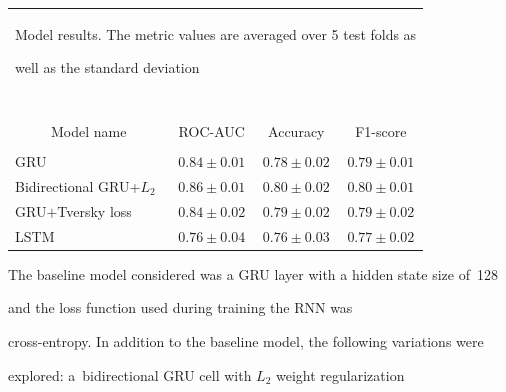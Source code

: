 \begin{table}[b]\small

\begin{center}

\begin{tabular}{lccc}

\multicolumn{4}{p{100mm}}{Model results. The metric values are averaged over 5 test folds as 

well as the standard deviation}\\

\multicolumn{4}{p{100mm}}{\ }\\[-6pt]

\hline

\multicolumn{1}{c}{Model name} & ROC-AUC & Accuracy & \multicolumn{1}{c}{F1-score} \\

\hline

&&\\[-10pt]

GRU & $0.84 \pm 0.01$ & $0.78 \pm 0.02$ & $0.79 \pm 0.01$\\

Bidirectional GRU\;+\;$L_2$ & $0.86 \pm 0.01$ & $0.80 \pm 0.02$ & $0.80 \pm 0.01$\\

GRU\;$+$\;Tversky loss & $0.84 \pm 0.02$ &  $0.79 \pm 0.02$ & $0.79 \pm 0.02$\\

LSTM & $0.76 \pm 0.04$ & $0.76 \pm 0.03$ & $0.77 \pm 0.02$ \\

\hline

\end{tabular}

\end{center}

\end{table}











The baseline model considered was a GRU layer with a hidden state size of~128 

and the loss function used during training the RNN was 

cross-entropy. In addition to the baseline model, the following variations were 

explored: a~bidirectional GRU cell with $L_2$ weight regularization 

